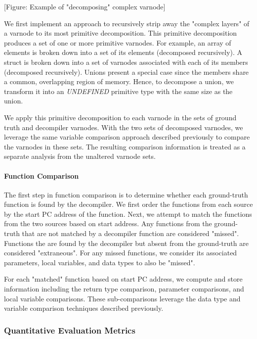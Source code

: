 \documentclass[conference]{IEEEtran}
\begin{document}
[Figure: Example of "decomposing" complex varnode]

We first implement an approach to recursively strip away the "complex layers" of a varnode to its most primitive decomposition. This primitive decomposition produces a set of one or more primitive varnodes. For example, an array of elements is broken down into a set of its elements (decomposed recursively). A struct is broken down into a set of varnodes associated with each of its members (decomposed recursively). Unions present a special case since the members share a common, overlapping region of memory. Hence, to decompose a union, we transform it into an \emph{UNDEFINED} primitive type with the same size as the union.

We apply this primitive decomposition to each varnode in the sets of ground truth and decompiler varnodes. With the two sets of decomposed varnodes, we leverage the same variable comparison approach described previously to compare the varnodes in these sets. The resulting comparison information is treated as a separate analysis from the unaltered varnode sets.

\paragraph{Function Comparison}

The first step in function comparison is to determine whether each ground-truth function is found by the decompiler. We first order the functions from each source by the start PC address of the function. Next, we attempt to match the functions from the two sources based on start address. Any functions from the ground-truth that are not matched by a decompiler function are considered "missed". Functions the are found by the decompiler but absent from the ground-truth are considered "extraneous". For any missed functions, we consider its associated parameters, local variables, and data types to also be "missed".

For each "matched" function based on start PC address, we compute and store information including the return type comparison, parameter comparisons, and local variable comparisons. These sub-comparisons leverage the data type and variable comparison techniques described previously.

\subsubsection{Quantitative Evaluation Metrics}
\end{document}
